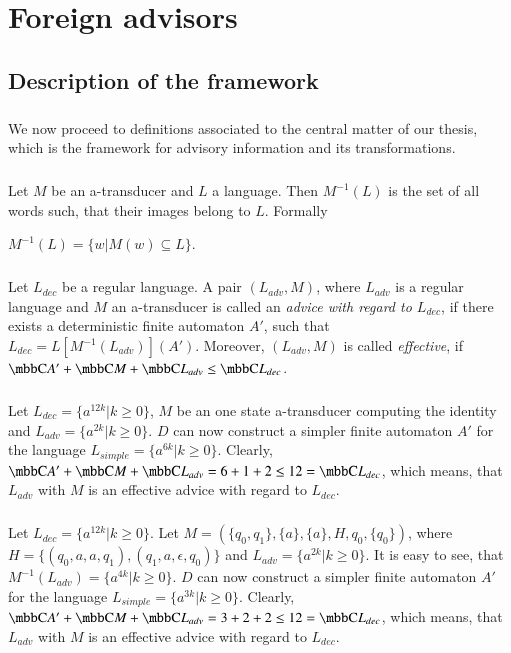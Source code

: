 \chapter{Foreign advisors}
\label{chap:advisors}

\section{Description of the framework}
\paragraph{}
We now proceed to definitions associated to the central matter of our thesis, which is the framework for advisory information and its transformations.

\paragraph{}
 Let $M$ be an a-transducer and $L$ a language. Then $M^{-1}(L)$ is the set of all words such, that their images belong to $L$. Formally \\
\centerline{$M^{-1}(L) = \{ w | M(w) \subseteq L \}$.}

\paragraph{}
 Let $L_{dec}$ be a regular language. A pair $(L_{adv}, M)$, where $L_{adv}$ is a regular language and $M$ an a-transducer is called an \emph{advice with regard to $L_{dec}$}, if there exists a deterministic finite automaton $A'$, such that $L_{dec} = L[M^{-1}(L_{adv})](A')$. Moreover, $(L_{adv}, M)$ is called \emph{effective}, if $\C{A'} + \C{M} + \C{L_{adv}} \leq	 \C{L_{dec}}$.

\paragraph{}
\cpriklad Let $L_{dec} = \{ a^{12k}| k \geq 0 \} $, $M$ be an one state a-transducer computing the identity and $L_{adv} = \{ a^{2k}| k \geq 0 \}$. $D$ can now construct a simpler finite automaton $A'$ for the language $L_{simple} = \{ a^{6k}| k \geq 0 \}$. Clearly, $\C{A'} + \C{M} + \C{L_{adv}} = 6 + 1 + 2 \leq 12 = \C{L_{dec}}$, which means, that $L_{adv}$ with $M$ is an effective advice with regard  to $L_{dec}$.

\paragraph{}
\cpriklad Let $L_{dec} = \{ a^{12k}| k \geq 0 \} $. Let $M= (\{q_0, q_1\}, \{a\}, \{a\}, H, q_0, \{q_0\})$, where $H = \{(q_0, a, a, q_1), (q_1, a, \epsilon, q_0)\}$ and $L_{adv} = \{ a^{2k}| k \geq 0 \}$. It is easy to see, that $M^{-1}(L_{adv}) = \{ a^{4k}| k \geq 0 \}$. $D$ can now construct a simpler finite automaton $A'$ for the language $L_{simple} = \{ a^{3k}| k \geq 0 \}$. Clearly, $\C{A'} + \C{M} + \C{L_{adv}} = 3 + 2 + 2 \leq 12 = \C{L_{dec}}$, which means, that $L_{adv}$ with $M$ is an effective advice with regard  to $L_{dec}$.

